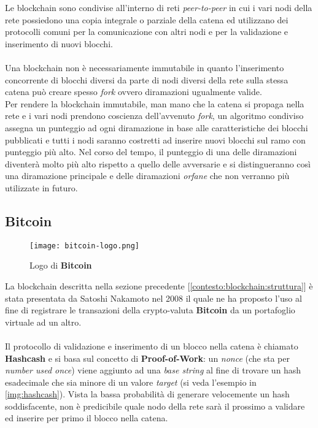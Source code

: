     Le blockchain sono condivise all'interno di reti \textit{peer-to-peer} in cui i vari nodi della rete possiedono una copia integrale o parziale della catena ed utilizzano dei protocolli comuni per la comunicazione con altri nodi e per la validazione e inserimento di nuovi blocchi.
    \\\\
    Una blockchain non è necessariamente immutabile in quanto l'inserimento concorrente di blocchi diversi da parte di nodi diversi della rete sulla stessa catena può creare spesso \textit{fork} ovvero diramazioni ugualmente valide.\\
    Per rendere la blockchain immutabile, man mano che la catena si propaga nella rete e i vari nodi prendono coscienza dell'avvenuto \textit{fork}, un algoritmo condiviso assegna un punteggio ad ogni diramazione in base alle caratteristiche dei blocchi pubblicati e tutti i nodi saranno costretti ad inserire nuovi blocchi sul ramo con punteggio più alto. Nel corso del tempo, il punteggio di una delle diramazioni diventerà molto più alto rispetto a quello delle avversarie e si distingueranno così una diramazione principale e delle diramazioni \textit{orfane} che non verranno più utilizzate in futuro.

    \subsection{Bitcoin}

    \begin{figure}[h!]
        \centering
        \texttt{[image: bitcoin-logo.png]}
        \caption{Logo di \textbf{Bitcoin}}
    \end{figure}

    La blockchain descritta nella sezione precedente [\autoref{contesto:blockchain:struttura}] è stata presentata da Satoshi Nakamoto nel 2008 \cite{nakamoto2008bitcoin} il quale ne ha proposto l'uso al fine di registrare le transazioni della crypto-valuta \textbf{Bitcoin} da un portafoglio virtuale ad un altro.
    \\\\
    Il protocollo di validazione e inserimento di un blocco nella catena è chiamato \textbf{Hashcash} e si basa sul concetto di \textbf{Proof-of-Work}: un \textit{nonce} (che sta per \textit{number used once}) viene aggiunto ad una \textit{base string} al fine di trovare un hash esadecimale che sia minore di un valore \textit{target} (si veda l'esempio in \autoref{img:hashcash}). Vista la bassa probabilità di generare velocemente un hash soddisfacente, non è predicibile quale nodo della rete sarà il prossimo a validare ed inserire per primo il blocco nella catena.

